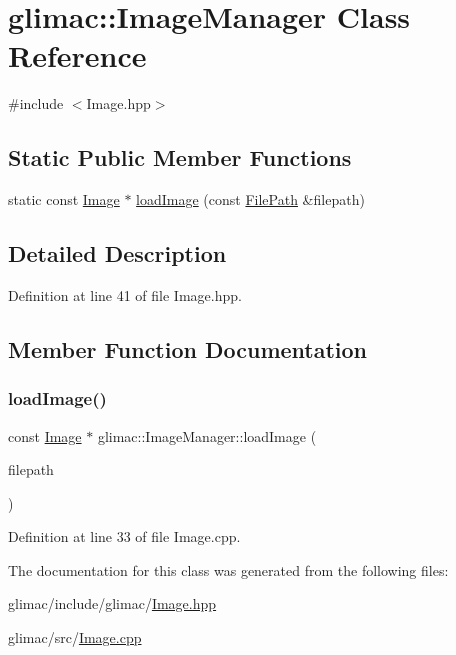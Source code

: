 \hypertarget{classglimac_1_1_image_manager}{}\section{glimac\+:\+:Image\+Manager Class Reference}
\label{classglimac_1_1_image_manager}


{\ttfamily \#include $<$Image.\+hpp$>$}

\subsection*{Static Public Member Functions}
\begin{DoxyCompactItemize}
\item 
static const \hyperlink{classglimac_1_1_image}{Image} $\ast$ \hyperlink{classglimac_1_1_image_manager_a491965842042b2ef01eade7136ddb54d}{load\+Image} (const \hyperlink{classglimac_1_1_file_path}{File\+Path} \&filepath)
\end{DoxyCompactItemize}


\subsection{Detailed Description}


Definition at line 41 of file Image.\+hpp.



\subsection{Member Function Documentation}
\mbox{\label{classglimac_1_1_image_manager_a491965842042b2ef01eade7136ddb54d}} 
\subsubsection{\texorpdfstring{load\+Image()}{loadImage()}}
{\footnotesize\ttfamily const \hyperlink{classglimac_1_1_image}{Image} $\ast$ glimac\+::\+Image\+Manager\+::load\+Image (\begin{DoxyParamCaption}\item[{const \hyperlink{classglimac_1_1_file_path}{File\+Path} \&}]{filepath }\end{DoxyParamCaption})\hspace{0.3cm}{\ttfamily [static]}}



Definition at line 33 of file Image.\+cpp.



The documentation for this class was generated from the following files\+:\begin{DoxyCompactItemize}
\item 
glimac/include/glimac/\hyperlink{_image_8hpp}{Image.\+hpp}\item 
glimac/src/\hyperlink{_image_8cpp}{Image.\+cpp}\end{DoxyCompactItemize}
